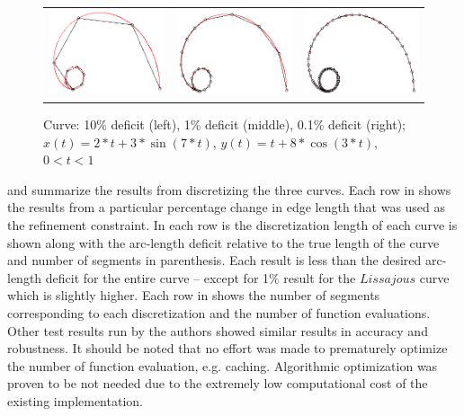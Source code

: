 \begin{figure}[h!]
  \centering
  \begin{tabular}{ccc}
  \includegraphics[width=0.3\linewidth]{Figures/cochleoid01.png} &
  \includegraphics[width=0.3\linewidth]{Figures/cochleoid001.png} &
  \includegraphics[width=0.3\linewidth]{Figures/cochleoid0001.png}
  \end{tabular}
  \caption{\label{fig:lastfigure} Curve: 10\% deficit (left), 1\% deficit (middle), 0.1\% deficit (right);\newline $x(t) = 2*t + 3*\sin(7*t)$, $y(t) = t + 8*\cos(3*t)$, $0<t<1$}
  \end{figure}

 and  summarize the results from discretizing the three curves. Each row in  shows the results from a particular percentage change in edge length that was used as the refinement constraint. In each row is the discretization length of each curve is shown along with the arc-length deficit relative to the true length of the curve and number of segments in parenthesis. Each result is less than the desired arc-length deficit for the entire curve -- except for 1\% result for the $Lissajous$ curve which is slightly higher. Each row in  shows the number of segments corresponding to each discretization and the number of function evaluations. Other test results run by the authors showed similar results in accuracy and robustness. It should be noted that no effort was made to prematurely optimize the number of function evaluation, e.g. caching. Algorithmic optimization was proven to be not needed due to the extremely low computational cost of the existing implementation.

